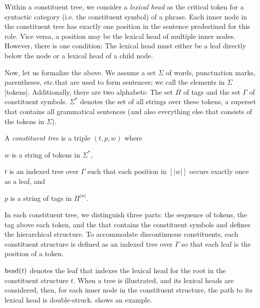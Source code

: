 \documentclass[../document.tex]{subfiles}
\begin{document}
    Within a constituent tree, we consider a \emph{lexical head} as the critical token for a syntactic category (i.e. the constituent symbol) of a phrase.
    Each inner node in the constituent tree has exactly one position in the sentence predestined for this role.
    Vice versa, a position may be the lexical head of multiple inner nodes.
    However, there is one condition: The lexical head must either be a leaf directly below the node or a lexical head of a child node.

    Now, let us formalize the above.
    We assume a set \(\Sigma\) of words, punctuation marks, parentheses, etc.\@ that are used to form sentences; we call the elements in \(\Sigma\) [tokens].
    Additionally, there are two alphabets: The set \(\varPi\) of  tags and the set \(\varGamma\) of constituent symbols.
    \(\Sigma^*\) denotes the set of all strings over these tokens, a superset that contains all grammatical sentences (and also everything else that consists of the tokens in \(\Sigma\)).

    A \emph{constituent tree} is a triple \((t, p, w)\) where
    \begin{compactitem}
        \item \(w\) is a string of tokens in \(\varSigma^*\),
        \item \(t\) is an indexed tree over \(\varGamma\) such that each position in \([|w|]\) occurs exactly once as a leaf, and
        \item \(p\) is a string of  tags in \(\varPi^{|w|}\).
    \end{compactitem}
    In each constituent tree, we distinguish three parts: the sequence of tokens, the  tag above each token, and the  that contains the constituent symbols and defines the hierarchical structure.
    To accommodate discontinuous constituents, each constituent structure is defined as an indexed tree over \(\varGamma\) so that each leaf is the position of a token.

    \(\operatorname{head}(t)\) denotes the leaf that indexes the lexical head for the root in the constituent structure \(t\).
    When a tree is illustrated, and its lexical heads are considered, then, for each inner node in the constituent structure, the path to its lexical head is double-struck.
     shows an example.
\end{document}
